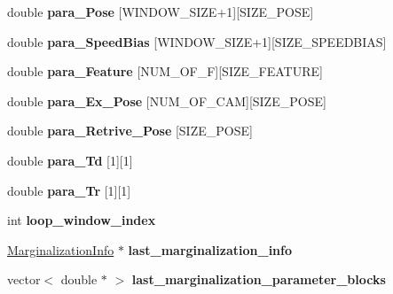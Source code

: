 \begin{DoxyCompactItemize}
double {\bfseries para\+\_\+\+Pose} \mbox{[}W\+I\+N\+D\+O\+W\+\_\+\+S\+I\+ZE+1\mbox{]}\mbox{[}S\+I\+Z\+E\+\_\+\+P\+O\+SE\mbox{]}
\item 
\mbox{\label{classEstimator_aeb6a30336a78f219f0ae9b40ae30d4b9}} 
double {\bfseries para\+\_\+\+Speed\+Bias} \mbox{[}W\+I\+N\+D\+O\+W\+\_\+\+S\+I\+ZE+1\mbox{]}\mbox{[}S\+I\+Z\+E\+\_\+\+S\+P\+E\+E\+D\+B\+I\+AS\mbox{]}
\item 
\mbox{\label{classEstimator_aeca39f6e3a06edf52e113840e2abe69b}} 
double {\bfseries para\+\_\+\+Feature} \mbox{[}N\+U\+M\+\_\+\+O\+F\+\_\+F\mbox{]}\mbox{[}S\+I\+Z\+E\+\_\+\+F\+E\+A\+T\+U\+RE\mbox{]}
\item 
\mbox{\label{classEstimator_aebc1cb85071d7c6849865e4d20a02780}} 
double {\bfseries para\+\_\+\+Ex\+\_\+\+Pose} \mbox{[}N\+U\+M\+\_\+\+O\+F\+\_\+\+C\+AM\mbox{]}\mbox{[}S\+I\+Z\+E\+\_\+\+P\+O\+SE\mbox{]}
\item 
\mbox{\label{classEstimator_a0ec701cfdc86b7b48734a0a26731187e}} 
double {\bfseries para\+\_\+\+Retrive\+\_\+\+Pose} \mbox{[}S\+I\+Z\+E\+\_\+\+P\+O\+SE\mbox{]}
\item 
\mbox{\label{classEstimator_a19f645fa7edf6b47ad0737300112077a}} 
double {\bfseries para\+\_\+\+Td} \mbox{[}1\mbox{]}\mbox{[}1\mbox{]}
\item 
\mbox{\label{classEstimator_abe559fb7fa6553c83cc3813a51ce289e}} 
double {\bfseries para\+\_\+\+Tr} \mbox{[}1\mbox{]}\mbox{[}1\mbox{]}
\item 
\mbox{\label{classEstimator_aede01f278966422211ea9996b62b54d8}} 
int {\bfseries loop\+\_\+window\+\_\+index}
\item 
\mbox{\label{classEstimator_ada21a832baba2ed43a09d025a73b1086}} 
\hyperlink{classMarginalizationInfo}{Marginalization\+Info} $\ast$ {\bfseries last\+\_\+marginalization\+\_\+info}
\item 
\mbox{\label{classEstimator_ac8e1ca84050653626b3a0850be59e344}} 
vector$<$ double $\ast$ $>$ {\bfseries last\+\_\+marginalization\+\_\+parameter\+\_\+blocks}

\end{DoxyCompactItemize}
